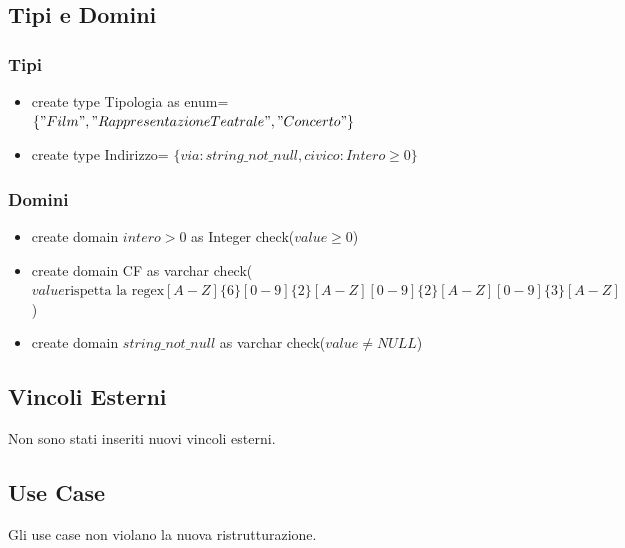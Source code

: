 \documentclass[12pt, letterpaper]{article}
\begin{document}
\subsection{Tipi e Domini}
\subsubsection{Tipi}
\begin{itemize}
    \item create type Tipologia as enum= $\{"Film", "Rappresentazione Teatrale", "Concerto"\}$
    \item create type Indirizzo= $\{via: string\_not\_null, civico: Intero \ge 0\}$
\end{itemize}
\subsubsection{Domini}
\begin{itemize}
    \item create domain $intero>0$ as Integer check($value \ge 0$)
    \item create domain CF as varchar check($value \text{rispetta la regex} [A-Z]\{6\}[0-9]\{2\}[A-Z][0-9]\{2\}[A-Z][0-9]\{3\}[A-Z]$)
    \item create domain $string\_not\_null$ as varchar check($value \neq NULL$)
    
\end{itemize}
\subsection{Vincoli Esterni}
Non sono stati inseriti nuovi vincoli esterni.
\subsection{Use Case}
Gli use case non violano la nuova ristrutturazione.
\newpage
\end{document}
